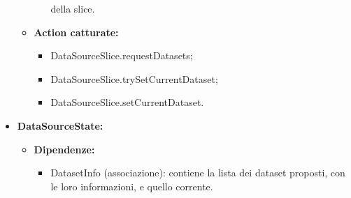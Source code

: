 \begin{itemize}
\begin{itemize}
\begin{itemize}
                                    della slice.
                        \end{itemize}
                  \item \textbf{Action catturate:}
                        \begin{itemize}
                              \item DataSourceSlice.requestDatasets;
                              \item DataSourceSlice.trySetCurrentDataset;
                              \item DataSourceSlice.setCurrentDataset.
                        \end{itemize}
            \end{itemize}

      \item \textbf{DataSourceState:}
            \begin{itemize}
                  \item \textbf{Dipendenze:}
                        \begin{itemize}
                              \item DatasetInfo (associazione): contiene la lista dei dataset proposti, con le loro
                                    informazioni, e quello corrente.
                        \end{itemize}
            \end{itemize}


\end{itemize}

